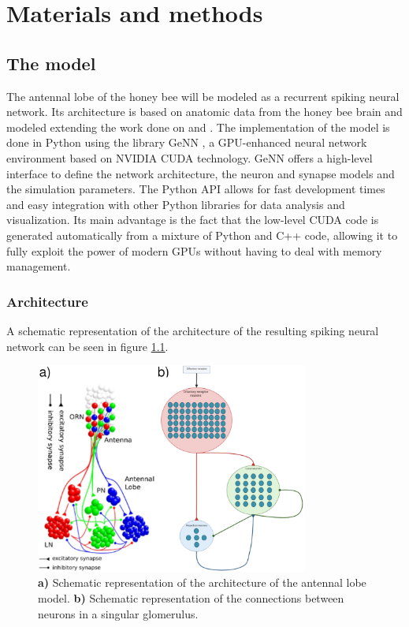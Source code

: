 \graphicspath{{chapters/04/images}}
\chapter{Materials and methods}

\section{The model}
The antennal lobe of the honey bee will be modeled as a recurrent spiking neural network.
Its architecture is based on anatomic data from the honey bee brain and modeled extending the work done on \cite{data-driven-antennal-lobe-model} and \cite{bee-geosmin}.
The implementation of the model is done in Python using the library GeNN \cite{genn}, a GPU-enhanced neural network environment based on NVIDIA CUDA \cite{cuda} technology.
GeNN offers a high-level interface to define the network architecture, the neuron and synapse models and the simulation parameters.
The Python API allows for fast development times and easy integration with other Python libraries for data analysis and visualization.
Its main advantage is the fact that the low-level CUDA code is generated automatically from a mixture of Python and C++ code, allowing it to fully exploit the power of modern GPUs without having to deal with memory management.

  \subsection{Architecture}
  A schematic representation of the architecture of the resulting spiking neural network can be seen in figure \ref{fig:al-architecture}.

  \begin{figure}
    \centering
    \includegraphics[width=0.8\textwidth]{al-architecture}
    \caption{\textbf{a)} Schematic representation of the architecture of the antennal lobe model. \textbf{b)} Schematic representation of the connections between neurons in a singular glomerulus.}
    \label{fig:al-architecture}
  \end{figure}

